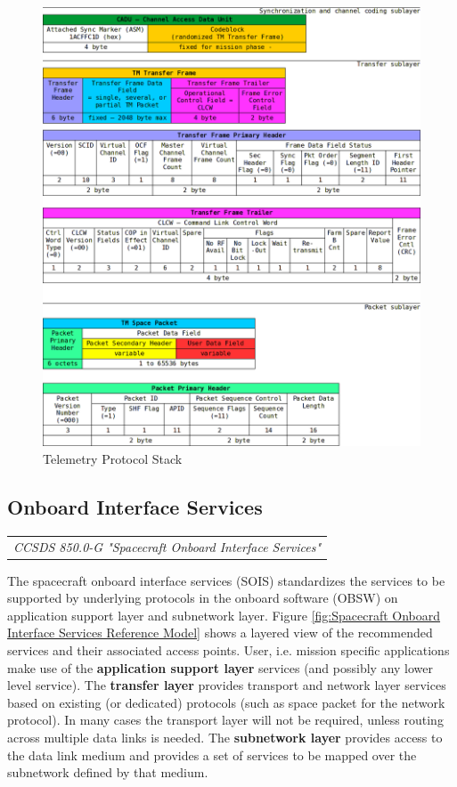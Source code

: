 \begin{figure}[h]
\centering\includegraphics[scale=0.4]{fig/telemetry_protocol_stack}
\caption{Telemetry Protocol Stack}
\label{fig:Telemetry Protocol Stack}
\end{figure}

\clearpage
\subsection{Onboard Interface Services}

\begin{tabular}{l}
\textit{CCSDS 850.0-G "Spacecraft Onboard Interface Services" \cite{CCSDS 850.0-G}} 
\end{tabular}

The spacecraft onboard interface services (SOIS) standardizes the services to be supported by underlying protocols in the onboard software (OBSW) on application support layer and subnetwork layer. Figure \ref{fig:Spacecraft Onboard Interface Services Reference Model} shows a layered view of the recommended services and their associated access points. User, i.e. mission specific applications make use of the \textbf{application support layer} services (and possibly any lower level service). The \textbf{transfer layer} provides transport and network layer services based on existing (or dedicated) protocols (such as space packet for the network protocol). In many cases the transport layer will not be required, unless routing across multiple data links is needed. The \textbf{subnetwork layer} provides access to the data link medium and provides a set of services to be mapped over the subnetwork defined by that medium.

